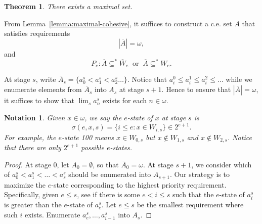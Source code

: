 \documentclass{article}
\newtheorem{notation}{Notation}[subsection]
\newtheorem{definition}{Definition}[subsection]
\newtheorem{theorem}{Theorem}[subsection]
\begin{document}


  \begin{theorem}
    There exists a maximal set.
  \end{theorem}

  From Lemma~\ref{lemma:maximal-cohesive}, it suffices to construct a c.e.
  set $A$ that satisfies requirements
  \begin{equation}
    |\overline{A}|=\omega,
    \label{eqn:R}
  \end{equation}
  and
  \begin{equation}
    P_e: \overline{A} \subseteq^*\overline{W}_e\;\; \text{or}\;\;
    \overline{A}\subseteq^* W_e.
    \label{eqn:P_e}
  \end{equation}

  At stage $s$, write $\overline{A}_s =\{a_0^s<a_1^s<a_2^s\ldots\}$. Notice
  that $a_i^0\leq a_i^1\leq a_i^2\leq\ldots$ while we enumerate elements
  from $\overline{A}_s$ into $A_s$ at stage $s+1$. Hence to ensure that
  $|\overline{A}|=\omega$, it suffices to show that $\lim_s a_n^s$ exists
  for each $n\in\omega$.

  \begin{notation}
    Given $x\in\omega$, we say the $e$-state of $x$ at stage $s$ is
    \[\sigma(e,x,s) =\{i\leq e: x\in W_{i,s}\} \in 2^{e+1}.\]
    For example, the $e$-state 100 means $x\in W_{0,s}$ but $x\not\in
    W_{1,s}$ and $x\not\in W_{2,s}$. Notice that there are only $2^{e+1}$
    possible $e$-states.
  \end{notation}

  \begin{proof}
    At stage 0, let $A_0=\emptyset$, so that $\overline{A}_0=\omega$. At
    stage $s+1$, we consider which of $a_0^s<a_1^s<\ldots<a_s^s$ should be
    enumerated into $A_{s+1}$. Our strategy is to maximize the $e$-state
    corresponding to the highest priority requirement. Specifically, given
    $e\leq s$, see if there is some $e<i\leq s$ such that the $e$-state of
    $a_i^s$ is greater than the $e$-state of $a_e^s$. Let $e\leq s$ be the
    smallest requirement where such $i$ exists. Enumerate
    $a_e^s,\ldots,a_{i-1}^s$ into $A_s$.
  \end{proof}
\end{document}
